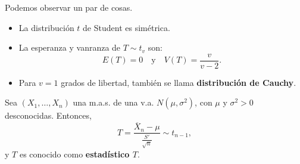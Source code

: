 \begin{observation}
Podemos observar un par de cosas. 
\begin{itemize}
\item La distribución $\displaystyle t $ de Student es simétrica. 
\item La esperanza y vanranza de $\displaystyle T \sim t_{v} $ son:
	\[E\left(T\right)=0 \quad \text{y} \quad V\left(T\right)=\frac{v}{v-2} .\]
\item Para $\displaystyle v = 1 $ grados de libertad, también se llama \textbf{distribución de Cauchy}. 	
\end{itemize}
\end{observation}
\begin{theorem}
Sea $\displaystyle \left(X_{1}, \ldots, X_{n}\right) $ una m.a.s. de una v.a. $\displaystyle N\left(\mu, \sigma^{2}\right) $, con $\displaystyle \mu $ y $\displaystyle \sigma^{2} > 0 $ desconocidas. Entonces,
\[T = \frac{\overline{X}_{n}-\mu}{\frac{S'}{\sqrt{n}}}\sim t_{n-1} ,\]
y $\displaystyle T $ es conocido como \textbf{estadístico $\displaystyle T $}. 
\end{theorem}

